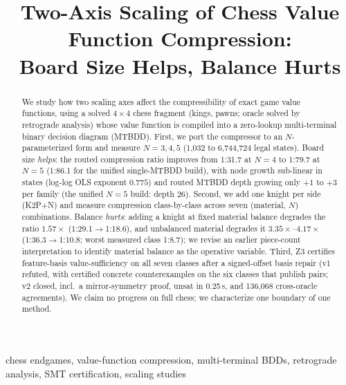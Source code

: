 \documentclass[conference]{IEEEtran}
\begin{document}
\title{Two-Axis Scaling of Chess Value Function Compression:\\
Board Size Helps, Balance Hurts}

\author{
}

\maketitle

\begin{abstract}
We study how two scaling axes affect the compressibility of exact game value
functions, using a solved $4\times 4$ chess fragment (kings, pawns; oracle
solved by retrograde analysis) whose value function is compiled into a
zero-lookup multi-terminal binary decision diagram (MTBDD). First, we port
the compressor to an $N$-parameterized form and measure $N=3,4,5$
(1{,}032 to 6{,}744{,}724 legal states). Board size \emph{helps}: the routed
compression ratio improves from 1:31.7 at $N{=}4$ to 1:79.7 at $N{=}5$
(1:86.1 for the unified single-MTBDD build), with node growth sub-linear in
states (log-log OLS exponent $0.775$) and routed MTBDD depth growing only
$+1$ to $+3$ per family (the unified $N{=}5$ build: depth 26).
Second, we add one knight per side (K2P+N) and measure compression
class-by-class across seven (material, $N$) combinations. Balance
\emph{hurts}: adding a knight at fixed material balance degrades the ratio
$1.57\times$ (1:29.1$\to$1:18.6), and unbalanced material degrades it
$3.35\times$--$4.17\times$ (1:36.3$\to$1:10.8; worst measured class 1:8.7);
we revise an earlier piece-count interpretation to identify material
balance as the operative variable.
Third, Z3 certifies feature-basis value-sufficiency on all seven classes
after a signed-offset basis repair (v1 refuted, with certified
concrete counterexamples on the six classes that publish pairs; v2 closed,
incl.\ a mirror-symmetry proof, unsat in 0.25\,s, and 136{,}068
cross-oracle agreements). We claim no progress on full chess; we characterize
one boundary of one method.
\end{abstract}

\begin{IEEEkeywords}
chess endgames, value-function compression, multi-terminal BDDs, retrograde
analysis, SMT certification, scaling studies
\end{IEEEkeywords}
\end{document}

